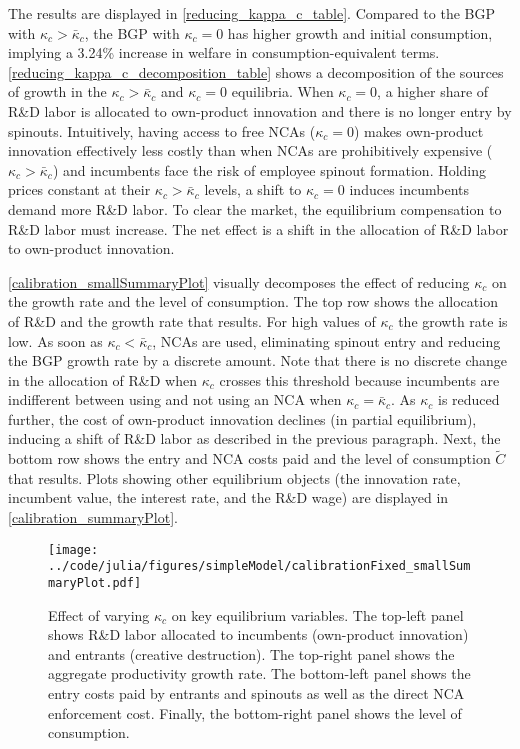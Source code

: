\documentclass[11pt,english]{article}
\theoremstyle{definition}
\begin{document}
The results are displayed in \autoref{reducing_kappa_c_table}. Compared to the BGP with $\kappa_c > \bar{\kappa}_c$, the BGP with $\kappa_c = 0$ has higher growth and initial consumption, implying a 3.24\% increase in welfare in consumption-equivalent terms. \autoref{reducing_kappa_c_decomposition_table} shows a decomposition of the sources of growth in the $\kappa_c > \bar{\kappa}_c$ and $\kappa_c = 0$ equilibria. When $\kappa_c = 0$, a higher share of R\&D labor is allocated to own-product innovation and there is no longer entry by spinouts. Intuitively, having access to free NCAs ($\kappa_c = 0$) makes own-product innovation effectively less costly than when NCAs are prohibitively expensive ($\kappa_c > \bar{\kappa}_c$) and incumbents face the risk of employee spinout formation. Holding prices constant at their $\kappa_c > \bar{\kappa}_c$ levels, a shift to $\kappa_c = 0$ induces incumbents demand more R\&D labor. To clear the market, the equilibrium compensation to R\&D labor must increase. The net effect is a shift in the allocation of R\&D labor to own-product innovation.

\autoref{calibration_smallSummaryPlot} visually decomposes the effect of reducing $\kappa_c$ on the growth rate and the level of consumption. The top row shows the allocation of R\&D and the growth rate that results. For high values of $\kappa_c$ the growth rate is low. As soon as $\kappa_c < \bar{\kappa}_c$, NCAs are used, eliminating spinout entry and reducing the BGP growth rate by a discrete amount. Note that there is no discrete change in the allocation of R\&D when $\kappa_c$ crosses this threshold because incumbents are indifferent between using and not using an NCA when $\kappa_c = \bar{\kappa}_c$. As $\kappa_c$ is reduced further, the cost of own-product innovation declines (in partial equilibrium), inducing a shift of R\&D labor as described in the previous paragraph. Next, the bottom row shows the entry and NCA costs paid and the level of consumption $\tilde{C}$ that results. Plots showing other equilibrium objects (the innovation rate, incumbent value, the interest rate, and the R\&D wage) are displayed in \autoref{calibration_summaryPlot}.

\begin{figure}[]
	\centering
	\texttt{[image: ../code/julia/figures/simpleModel/calibrationFixed\_smallSummaryPlot.pdf]}
	\caption{Effect of varying $\kappa_c$ on key equilibrium variables. The top-left panel shows R\&D labor allocated to incumbents (own-product innovation) and entrants (creative destruction). The top-right panel shows the aggregate productivity growth rate. The bottom-left panel shows the entry costs paid by entrants and spinouts as well as the direct NCA enforcement cost. Finally, the bottom-right panel shows the level of consumption.}
	\label{calibration_smallSummaryPlot}
\end{figure}
\end{document}
